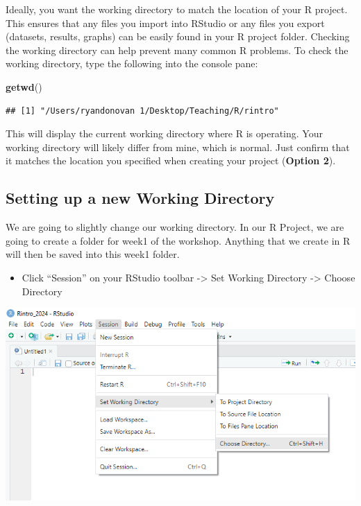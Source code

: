 \documentclass[
]{book}
\newenvironment{Shaded}{\begin{snugshade}}{\end{snugshade}}
\newcommand{\FunctionTok}[1]{\textcolor[rgb]{0.13,0.29,0.53}{\textbf{#1}}}
\newcommand{\NormalTok}[1]{#1}
\providecommand{\tightlist}{%
  \setlength{\itemsep}{0pt}\setlength{\parskip}{0pt}}
\begin{document}
Ideally, you want the working directory to match the location of your R project. This ensures that any files you import into RStudio or any files you export (datasets, results, graphs) can be easily found in your R project folder. Checking the working directory can help prevent many common R problems. To check the working directory, type the following into the console pane:

\begin{Shaded}
\begin{Highlighting}[]
\FunctionTok{getwd}\NormalTok{()}
\end{Highlighting}
\end{Shaded}

\begin{verbatim}
## [1] "/Users/ryandonovan 1/Desktop/Teaching/R/rintro"
\end{verbatim}

This will display the current working directory where R is operating. Your working directory will likely differ from mine, which is normal. Just confirm that it matches the location you specified when creating your project (\textbf{Option 2}).

\hypertarget{set_wd}{%
\subsection{Setting up a new Working Directory}\label{set_wd}}

We are going to slightly change our working directory. In our R Project, we are going to create a folder for week1 of the workshop. Anything that we create in R will then be saved into this week1 folder.

\begin{itemize}
\tightlist
\item
  Click ``Session'' on your RStudio toolbar -\textgreater{} Set Working Directory -\textgreater{} Choose Directory
\end{itemize}

\includegraphics{img/01-wd.png}
\end{document}
